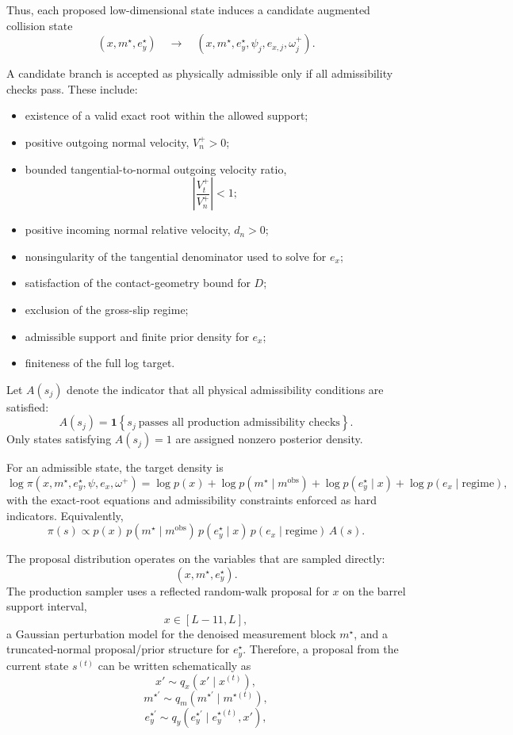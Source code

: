 \documentclass[11pt]{article}
\begin{document}
Thus, each proposed low-dimensional state induces a candidate augmented collision state
\[
(x,m^{\star},e_y^{\star})
\quad \longrightarrow \quad
\left(
x,m^{\star},e_y^{\star},\psi_j,e_{x,j},\omega_j^+
\right).
\]

A candidate branch is accepted as physically admissible only if all admissibility checks pass. These include:


\begin{itemize}
    \item existence of a valid exact root within the allowed support;
    \item positive outgoing normal velocity, \(V_n^+ > 0\);
    \item bounded tangential-to-normal outgoing velocity ratio,
    \[
    \left| \frac{V_t^+}{V_n^+} \right| < 1;
    \]
    \item positive incoming normal relative velocity, \(d_n > 0\);
    \item nonsingularity of the tangential denominator used to solve for \(e_x\);
    \item satisfaction of the contact-geometry bound for \(D\);
    \item exclusion of the gross-slip regime;
    \item admissible support and finite prior density for \(e_x\);
    \item finiteness of the full log target.
\end{itemize}

Let \(A(s_j)\) denote the indicator that all physical admissibility conditions are
satisfied:
\[
A(s_j)
=
\mathbf{1}
\left\{
s_j \ \text{passes all production admissibility checks}
\right\}.
\]
Only states satisfying \(A(s_j)=1\) are assigned nonzero posterior density.

For an admissible state, the target density is
\begin{equation}
\log \pi
\left(
x,m^{\star},e_y^{\star},\psi,e_x,\omega^+
\right)
=
\log p(x)
+
\log p(m^{\star}\mid m^{\mathrm{obs}})
+
\log p(e_y^{\star}\mid x)
+
\log p(e_x\mid \mathrm{regime}),
\label{eq:mcmc_log_target}
\end{equation}
with the exact-root equations and admissibility constraints enforced as hard
indicators. Equivalently,
\[
\pi(s)
\propto
p(x)\,
p(m^{\star}\mid m^{\mathrm{obs}})\,
p(e_y^{\star}\mid x)\,
p(e_x\mid \mathrm{regime})\,
A(s).
\]

The proposal distribution operates on the variables that are sampled directly:
\[
(x,m^{\star},e_y^{\star}).
\]
The production sampler uses a reflected random-walk proposal for \(x\) on the
barrel support interval,
\[
x \in [L-11,L],
\]
a Gaussian perturbation model for the denoised measurement block \(m^{\star}\),
and a truncated-normal proposal/prior structure for \(e_y^{\star}\). Therefore,
a proposal from the current state \(s^{(t)}\) can be written schematically as
\[
x' \sim q_x(x'\mid x^{(t)}),
\]
\[
m^{\star\prime} \sim q_m(m^{\star\prime}\mid m^{\star(t)}),
\]
\[
e_y^{\star\prime} \sim q_y(e_y^{\star\prime}\mid e_y^{\star(t)},x'),
\]
\end{document}
